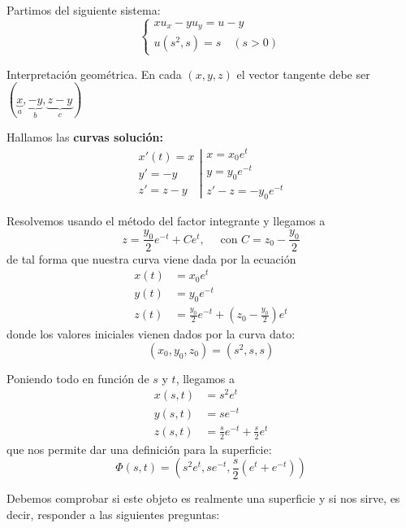 	\begin{example}
		Partimos del siguiente sistema:
		\begin{equation*}
			\left\{
			\begin{array}{l}
				xu_x - yu_y = u - y \\
				u(s^2,s) = s \quad (s > 0)
			\end{array}
			\right.
		\end{equation*}

		Interpretación geométrica. En cada $(x,y,z)$ el vector tangente debe ser $(\underbrace{x}_{a},\underbrace{-y}_{b},\underbrace{z-y}_{c})$

		Hallamos las \textbf{curvas solución:}
		\begin{equation*}
			\left.
			\begin{array}{rl}
				 x'(t) = x \\
				 y' = -y \\
				 z' = z-y
			\end{array}
			\right|
			\begin{array}{l}
				x = x_0 e^t \\
				y = y_0 e^{-t} \\
				z' -z = -y_0 e^{-t}
			\end{array}
		\end{equation*}

		Resolvemos usando el método del factor integrante y llegamos a \[ z = \frac{y_0}{2} e^{-t} + C e^t , \quad\text{ con } C = z_0 - \frac{y_0}{2} \] de tal forma que nuestra curva viene dada por la ecuación
		\begin{align*}
			x(t) &= x_0 e^t \\
			y(t) &= y_0 e^{-t} \\
			z(t) &= \frac{y_0}{2} e^{-t} + (z_0 - \frac{y_0}{2})e^t
		\end{align*} donde los valores iniciales vienen dados por la curva dato: \[ (x_0,y_0,z_0) = (s^2,s,s) \]

		Poniendo todo en función de $s$ y $t$, llegamos a
		\begin{align*}
		x(s,t) &= s^2 e^t \\
		y(s,t) &= se^{-t} \\
		z(s,t) &= \frac{s}{2}e^{-t} + \frac{s}{2}e^{t}
		\end{align*}
		que nos permite dar una definición para la superficie:
		\[
			\Phi(s,t) = \left(s^2e^t, se^{-t}, \frac{s}{2}(e^t + e^{-t}) \right )
		\]

		Debemos comprobar si este objeto es realmente una superficie y si nos sirve, es decir, responder a las siguientes preguntas:


\end{example}
